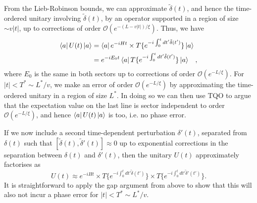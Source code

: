\documentclass[aps,pra,floatfix,footinbib,longbibliography,twocolumn,superscriptaddress, preprintnumbers, nobibnotes]{revtex4-1}
\begin{document}
From the Lieb-Robinson bounds, we can approximate $\tilde{\delta}(t)$, and hence the time-ordered unitary involving $\tilde{\delta}(t)$, by an operator supported in a region of size $\sim v |t|$, up to corrections of order $\mathcal{O}(e^{-(L- v|t|)/\xi})$. Thus, we have
\begin{align}
\left\langle a\right|U(t)\left|a\right\rangle & = \left\langle a\right|e^{-i H t} \times T \{ e^{-i \int_0^t dt' \tilde{\delta}(t') } \}\left|a\right\rangle \nonumber
\\
& = e^{-i E_0 t} \left\langle a\right| T \{ e^{-i \int_0^t dt' \tilde{\delta}(t') } \}\left|a\right\rangle \;\;\;,
\end{align}
where $E_0$ is the same in both sectors up to corrections of order $\mathcal{O}(e^{-L/\xi})$. For $|t| < T^* \sim L^*/v$, we make an error of order $\mathcal{O}(e^{-L/\xi})$ by approximating the time-ordered unitary in a region of size $L^*$. In doing so we can then use TQO to argue that the expectation value on the last line is sector independent to order $\mathcal{O}(e^{-L/\xi})$, and hence $\left\langle a\right|U(t)\left|a\right\rangle$ is too, i.e. no phase error.

If we now include a second time-dependent perturbation $\delta'(t)$, separated from $\delta(t)$ such that $[\tilde{\delta}(t),\tilde{\delta}'(t)]\approx 0$ up to exponential corrections in the separation between $\delta (t)$ and $\delta' (t)$, then the unitary $U(t)$ approximately factorises as
\begin{equation}
U(t) \approx e^{-i H t} \times T \{ e^{-i \int_0^t dt' \tilde{\delta}(t') } \} \times T \{ e^{-i \int_0^t dt' \tilde{\delta}'(t') } \} .
\end{equation}
It is straightforward to apply the gap argument from above to show that this will also not incur a phase error for $|t|<T^* \sim L^*/v$.
\end{document}
